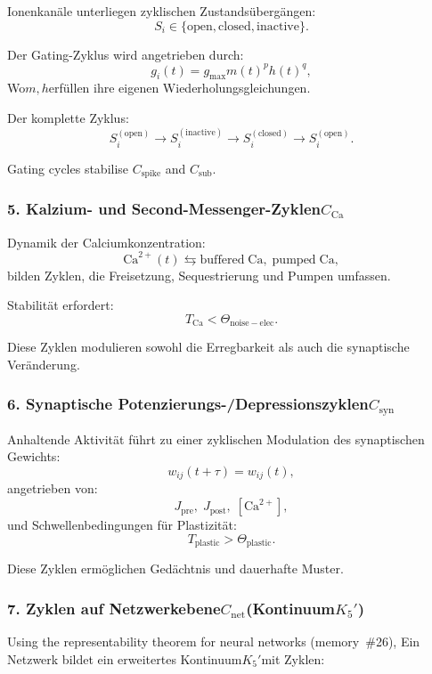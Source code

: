 Ionenkanäle unterliegen zyklischen Zustandsübergängen:
\[
  S_i \in \{\mathrm{open}, \mathrm{closed}, \mathrm{inactive}\}.
\]

Der Gating-Zyklus wird angetrieben durch:
\[
  g_i(t) = g_{\mathrm{max}} m(t)^p h(t)^q,
\]
Wo$m,h$erfüllen ihre eigenen Wiederholungsgleichungen.

Der komplette Zyklus:
\[
  S_i^{(\mathrm{open})}
  \to 
  S_i^{(\mathrm{inactive})}
  \to
  S_i^{(\mathrm{closed})}
  \to
  S_i^{(\mathrm{open})}.
\]

Gating cycles stabilise $C_{\mathrm{spike}}$ and $C_{\mathrm{sub}}$.

\subsubsection{5. Kalzium- und Second-Messenger-Zyklen$C_{\mathrm{Ca}}$}

Dynamik der Calciumkonzentration:
\[
  \mathrm{Ca}^{2+}(t)
  \leftrightarrows
  \mathrm{buffered\; Ca},\;
  \mathrm{pumped\; Ca},
\]
bilden Zyklen, die Freisetzung, Sequestrierung und Pumpen umfassen.

Stabilität erfordert:
\[
  T_{\mathrm{Ca}} < \Theta_{\mathrm{noise-elec}}.
\]

Diese Zyklen modulieren sowohl die Erregbarkeit als auch die synaptische Veränderung.

\subsubsection{6. Synaptische Potenzierungs-/Depressionszyklen$C_{\mathrm{syn}}$}

Anhaltende Aktivität führt zu einer zyklischen Modulation des synaptischen Gewichts:
\[
  w_{ij}(t+\tau) = w_{ij}(t),
\]
angetrieben von:
\[
  J_{\mathrm{pre}},\; J_{\mathrm{post}},\; [\mathrm{Ca}^{2+}],
\]
und Schwellenbedingungen für Plastizität:
\[
  T_{\mathrm{plastic}} > \Theta_{\mathrm{plastic}}.
\]

Diese Zyklen ermöglichen Gedächtnis und dauerhafte Muster.

\subsubsection{7. Zyklen auf Netzwerkebene$C_{\mathrm{net}}$(Kontinuum$K_5'$)}

Using the representability theorem for neural networks (memory~\#26),
Ein Netzwerk bildet ein erweitertes Kontinuum$K_5'$mit Zyklen:

